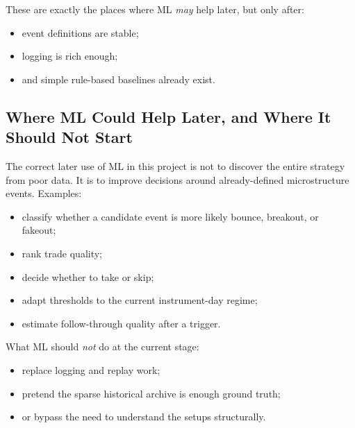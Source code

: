 These are exactly the places where ML \emph{may} help later, but only after:
\begin{itemize}
  \item event definitions are stable;
  \item logging is rich enough;
  \item and simple rule-based baselines already exist.
\end{itemize}

\subsection{Where ML Could Help Later, and Where It Should Not Start}

The correct later use of ML in this project is not to discover the entire strategy from poor data.
It is to improve decisions around already-defined microstructure events.
Examples:
\begin{itemize}
  \item classify whether a candidate event is more likely bounce, breakout, or fakeout;
  \item rank trade quality;
  \item decide whether to take or skip;
  \item adapt thresholds to the current instrument-day regime;
  \item estimate follow-through quality after a trigger.
\end{itemize}

What ML should \emph{not} do at the current stage:
\begin{itemize}
  \item replace logging and replay work;
  \item pretend the sparse historical archive is enough ground truth;
  \item or bypass the need to understand the setups structurally.
\end{itemize}
